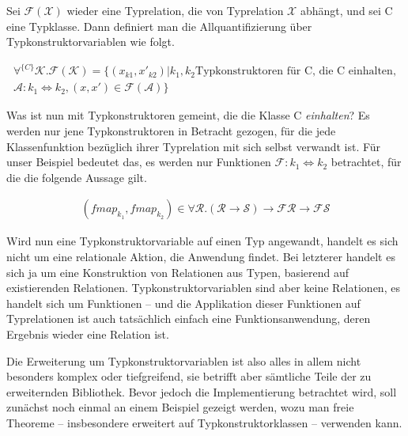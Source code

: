Sei $\mathcal{F}(\mathcal{X})$ wieder eine Typrelation, die von Typrelation $\mathcal{X}$ abhängt, und sei C eine Typklasse.
Dann definiert man die Allquantifizierung über Typkonstruktorvariablen wie folgt.

\begin{align*}
\forall^{\{C\}} \mathcal{K} . \mathcal{F}(\mathcal{K}) = \{ 
(x_{k1}, x'_{k2}) | k_1, k_2 \text{Typkonstruktoren für C, die C einhalten},\\
\mathcal{A} : k_1 \Leftrightarrow k_2, (x, x') \in \mathcal{F}(\mathcal{A})
\}
\end{align*}

Was ist nun mit Typkonstruktoren gemeint, die die Klasse C \textit{einhalten}? Es werden nur jene Typkonstruktoren in Betracht gezogen,
für die jede Klassenfunktion bezüglich ihrer Typrelation mit sich selbst verwandt ist. Für unser Beispiel bedeutet das, es werden nur
Funktionen $\mathcal{F} : k_1 \Leftrightarrow k_2$ betrachtet, für die die folgende Aussage gilt.

\begin{align*}
(fmap_{k_1}, fmap_{k_2}) \in \forall \mathcal{R} . (\mathcal{R} \rightarrow \mathcal{S}) \rightarrow \mathcal{F} \mathcal{R}
\rightarrow \mathcal{F} \mathcal{S}
\end{align*}


Wird nun eine Typkonstruktorvariable auf einen Typ angewandt, handelt es sich nicht um eine relationale Aktion, die Anwendung findet.
Bei letzterer handelt es sich ja um eine Konstruktion von Relationen aus Typen, basierend auf existierenden Relationen.
Typkonstruktorvariablen sind aber keine Relationen, es handelt sich um Funktionen -- und die Applikation dieser Funktionen auf
Typrelationen ist auch tatsächlich einfach eine Funktionsanwendung, deren Ergebnis wieder eine Relation ist.

Die Erweiterung um Typkonstruktorvariablen ist also alles in allem nicht besonders komplex oder tiefgreifend, sie betrifft aber sämtliche
Teile der zu erweiternden Bibliothek. Bevor jedoch die Implementierung betrachtet wird, soll zunächst noch einmal an
einem Beispiel gezeigt werden, wozu man freie Theoreme -- insbesondere erweitert auf Typkonstruktorklassen -- verwenden kann.


